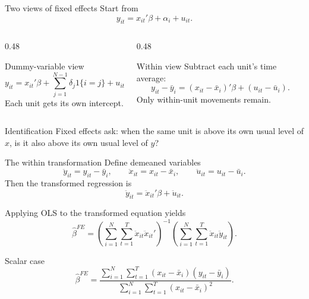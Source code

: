 \documentclass[10pt]{beamer}
\begin{document}
\begin{frame}{Two views of fixed effects}
\label{slide:feidea}
\small
Start from
\[
y_{it} = x_{it}'\beta + \alpha_i + u_{it}.
\]

\begin{columns}[T]
\begin{column}{0.48\textwidth}
\begin{block}{Dummy-variable view}
\[
y_{it} = x_{it}'\beta + \sum_{j=1}^{N-1}\delta_j 1\{i=j\} + u_{it}.
\]
Each unit gets its own intercept.
\end{block}
\end{column}
\begin{column}{0.48\textwidth}
\begin{block}{Within view}
Subtract each unit's time average:
\[
y_{it}-\bar{y}_i = (x_{it}-\bar{x}_i)'\beta + (u_{it}-\bar{u}_i).
\]
Only within-unit movements remain.
\end{block}
\end{column}
\end{columns}

\pause
\begin{alertblock}{Identification}
Fixed effects ask: when the same unit is above its own usual level of $x$, is it also above its own usual level of $y$?
\end{alertblock}
\end{frame}

\begin{frame}{The within transformation}
\label{slide:withinalgebra}
\small
Define demeaned variables
\[
\ddot{y}_{it}=y_{it}-\bar{y}_i,
\qquad
\ddot{x}_{it}=x_{it}-\bar{x}_i,
\qquad
\ddot{u}_{it}=u_{it}-\bar{u}_i.
\]
Then the transformed regression is
\[
\ddot{y}_{it} = \ddot{x}_{it}'\beta + \ddot{u}_{it}.
\]

\pause
Applying OLS to the transformed equation yields
\[
\hat{\beta}^{FE}
=
\left(\sum_{i=1}^N \sum_{t=1}^T \ddot{x}_{it}\ddot{x}_{it}'\right)^{-1}
\left(\sum_{i=1}^N \sum_{t=1}^T \ddot{x}_{it}\ddot{y}_{it}\right).
\]

\pause
\begin{exampleblock}{Scalar case}
\[
\hat{\beta}^{FE}
=
\frac{\sum_{i=1}^N \sum_{t=1}^T (x_{it}-\bar{x}_i)(y_{it}-\bar{y}_i)}
{\sum_{i=1}^N \sum_{t=1}^T (x_{it}-\bar{x}_i)^2}.
\]
\end{exampleblock}
\end{frame}
\end{document}
